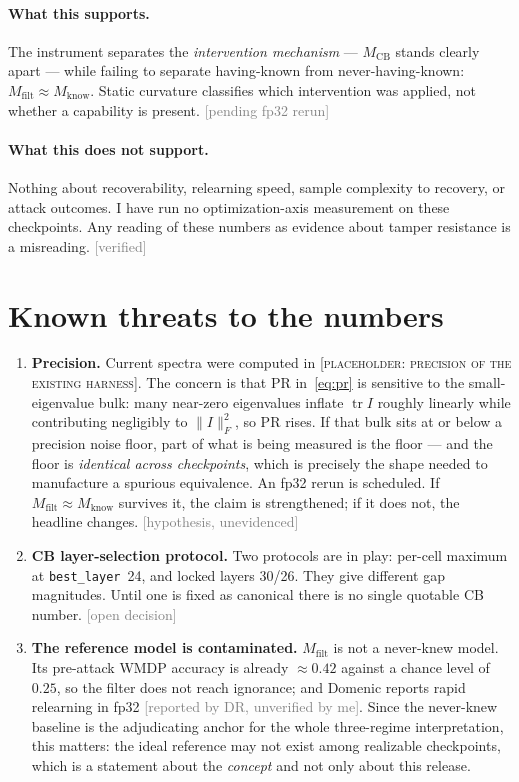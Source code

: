 \documentclass[11pt]{article}
\newcommand{\status}[1]{\textcolor{gray}{\footnotesize\textsf{[#1]}}}
\newcommand{\verified}{\status{verified}}
\newcommand{\pending}{\status{pending fp32 rerun}}
\newcommand{\hypothesis}{\status{hypothesis, unevidenced}}
\newcommand{\open}{\status{open decision}}
\newcommand{\external}{\status{reported by DR, unverified by me}}
\begin{document}
\paragraph{What this supports.} The instrument separates the \emph{intervention
mechanism} --- $M_{\mathrm{CB}}$ stands clearly apart --- while failing to
separate having-known from never-having-known:
$M_{\mathrm{filt}} \approx M_{\mathrm{know}}$. Static curvature classifies
which intervention was applied, not whether a capability is present.
\pending{}

\paragraph{What this does not support.} Nothing about recoverability,
relearning speed, sample complexity to recovery, or attack outcomes. I have run
no optimization-axis measurement on these checkpoints. Any reading of these
numbers as evidence about tamper resistance is a misreading. \verified{}

\section{Known threats to the numbers}
\label{sec:threats}

\begin{enumerate}[leftmargin=*]

\item \textbf{Precision.} Current spectra were computed in
\textsc{[placeholder: precision of the existing harness]}. The concern is that
$\mathrm{PR}$ in~\eqref{eq:pr} is sensitive to the small-eigenvalue bulk: many
near-zero eigenvalues inflate $\operatorname{tr} I$ roughly linearly while
contributing negligibly to $\|I\|_F^2$, so $\mathrm{PR}$ rises. If that bulk
sits at or below a precision noise floor, part of what is being measured is the
floor --- and the floor is \emph{identical across checkpoints}, which is
precisely the shape needed to manufacture a spurious equivalence. An fp32 rerun
is scheduled. If $M_{\mathrm{filt}} \approx M_{\mathrm{know}}$ survives it, the
claim is strengthened; if it does not, the headline changes. \hypothesis{}

\item \textbf{CB layer-selection protocol.} Two protocols are in play:
per-cell maximum at \texttt{best\_layer}~24, and locked layers 30/26. They give
different gap magnitudes. Until one is fixed as canonical there is no single
quotable CB number. \open{}

\item \textbf{The reference model is contaminated.} $M_{\mathrm{filt}}$ is not
a never-knew model. Its pre-attack WMDP accuracy is already $\approx 0.42$
against a chance level of $0.25$, so the filter does not reach ignorance; and
Domenic reports rapid relearning in fp32 \external{}. Since the never-knew
baseline is the adjudicating anchor for the whole three-regime interpretation,
this matters: the ideal reference may not exist among realizable checkpoints,
which is a statement about the \emph{concept} and not only about this release.

\end{enumerate}
\end{document}
